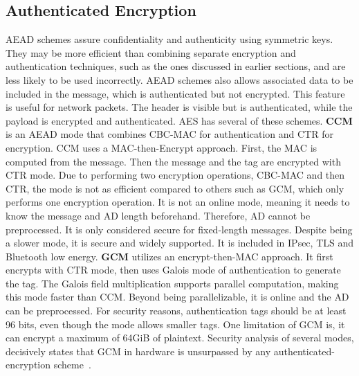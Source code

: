 \subsection{Authenticated Encryption}\label{chap:background:crypto:aead}

\ac{AEAD} schemes assure confidentiality and authenticity using symmetric keys. They may be more efficient than combining separate encryption and authentication techniques, such as the ones discussed in earlier sections, and are less likely to be used incorrectly. \ac{AEAD} schemes also allows associated data to be included in the message, which is authenticated but not encrypted. This feature is useful for network packets. The header is visible but is authenticated, while the payload is encrypted and authenticated. 
\ac{AES} has several of these schemes. \textbf{\ac{CCM}} is an \ac{AEAD} mode that combines \ac{CBC-MAC} for authentication and \ac{CTR} for encryption.
\ac{CCM} uses a MAC-then-Encrypt approach. First, the \ac{MAC} is computed from the message. Then the message and the tag are encrypted with \ac{CTR} mode.
Due to performing two encryption operations, \ac{CBC-MAC} and then \ac{CTR}, the mode is not as efficient compared to others such as \ac{GCM}, which only performs one encryption operation.
It is not an online mode, meaning it needs to know the message and \ac{AD} length beforehand. Therefore, \ac{AD} cannot be preprocessed. It is only considered secure for fixed-length messages.
Despite being a slower mode, it is secure and widely supported. It is included in \ac{IPsec}, \ac{TLS} and Bluetooth low energy.
\textbf{\ac{GCM}} utilizes an encrypt-then-MAC approach. It first encrypts with \ac{CTR} mode, then uses Galois mode of authentication to generate the tag. The Galois field multiplication supports parallel computation, making this mode faster than \ac{CCM}.
Beyond being parallelizable, it is online and the \ac{AD} can be preprocessed.
For security reasons, authentication tags should be at least 96 bits, even though the mode allows smaller tags. One limitation of \ac{GCM} is, it can encrypt a maximum of 64GiB of plaintext. Security analysis of several modes, decisively states that \ac{GCM} in hardware is unsurpassed by any authenticated-encryption scheme~\cite{aesmodes}.




